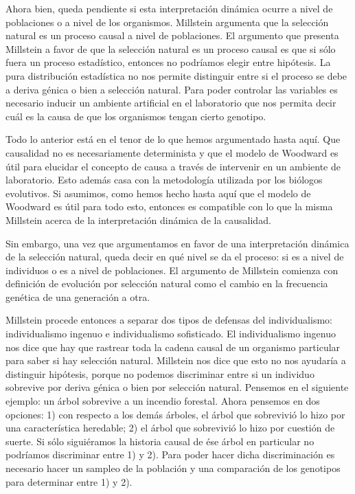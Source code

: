Ahora bien, queda pendiente si esta interpretación dinámica ocurre a nivel de poblaciones o a nivel de los organismos. Millstein \citeyear{Millstein2006} argumenta que la selección natural es un proceso causal a nivel de poblaciones. El argumento que presenta Millstein a favor de que la selección natural es un proceso causal es que si sólo fuera un proceso estadístico, entonces no podríamos elegir entre hipótesis. La pura distribución estadística no nos permite distinguir entre si el proceso se debe a deriva génica o bien a selección natural. Para poder controlar las variables es necesario inducir un ambiente artificial en el laboratorio que nos permita decir cuál es la causa de que los organismos tengan cierto genotipo.

Todo lo anterior está en el tenor de lo que hemos argumentado hasta aquí. Que causalidad no es necesariamente determinista y que el modelo de Woodward es útil para elucidar el concepto de causa a través de intervenir en un ambiente de laboratorio. Esto además casa con la metodología utilizada por los biólogos evolutivos. Si asumimos, como hemos hecho hasta aquí que el modelo de Woodward es útil para todo esto, entonces es compatible con lo que la misma Millstein acerca de la interpretación dinámica de la causalidad.

Sin embargo, una vez que argumentamos en favor de una interpretación dinámica de la selección natural, queda decir en qué nivel se da el proceso: si es a nivel de individuos o es a nivel de poblaciones. El argumento de Millstein comienza con definición de evolución por selección natural como el cambio en la frecuencia genética de una generación a otra.

Millstein procede entonces a separar dos tipos de defensas del individualismo: individualismo ingenuo e individualismo sofisticado. El individualismo ingenuo nos dice que hay que rastrear toda la cadena causal de un organismo particular para saber si hay selección natural. Millstein nos dice que esto no nos ayudaría a distinguir hipótesis, porque no podemos discriminar entre si un individuo sobrevive por deriva génica o bien por selección natural. Pensemos en el siguiente ejemplo: un árbol sobrevive a un incendio forestal. Ahora pensemos en dos opciones: 1) con respecto a los demás árboles, el árbol que sobrevivió lo hizo por una característica heredable; 2) el árbol que sobrevivió lo hizo por cuestión de suerte. Si sólo siguiéramos la historia causal de ése árbol en particular no podríamos discriminar entre 1) y 2). Para poder hacer dicha discriminación es necesario hacer un sampleo de la población y una comparación de los genotipos para determinar entre 1) y 2).

